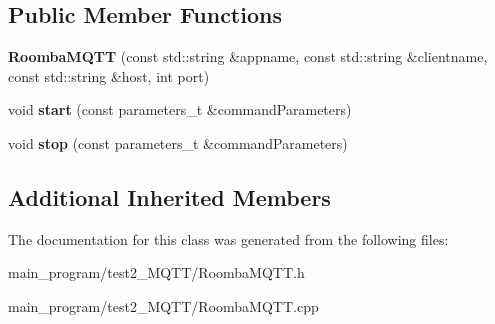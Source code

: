 \subsection*{Public Member Functions}
\begin{DoxyCompactItemize}
\item 
{\bfseries Roomba\+M\+Q\+TT} (const std\+::string \&appname, const std\+::string \&clientname, const std\+::string \&host, int port)\hypertarget{class_roomba_m_q_t_t_a20d5a60deabb9b8148a3cf0f1409dc71}{}\label{class_roomba_m_q_t_t_a20d5a60deabb9b8148a3cf0f1409dc71}

\item 
void {\bfseries start} (const parameters\+\_\+t \&command\+Parameters)\hypertarget{class_roomba_m_q_t_t_a5ff4dbb094de2963bf4967fd5bf55b83}{}\label{class_roomba_m_q_t_t_a5ff4dbb094de2963bf4967fd5bf55b83}

\item 
void {\bfseries stop} (const parameters\+\_\+t \&command\+Parameters)\hypertarget{class_roomba_m_q_t_t_ac0a3f9c36b0865eb3e61e68ad0ef2115}{}\label{class_roomba_m_q_t_t_ac0a3f9c36b0865eb3e61e68ad0ef2115}

\end{DoxyCompactItemize}
\subsection*{Additional Inherited Members}


The documentation for this class was generated from the following files\+:\begin{DoxyCompactItemize}
\item 
main\+\_\+program/test2\+\_\+\+M\+Q\+T\+T/Roomba\+M\+Q\+T\+T.\+h\item 
main\+\_\+program/test2\+\_\+\+M\+Q\+T\+T/Roomba\+M\+Q\+T\+T.\+cpp\end{DoxyCompactItemize}
